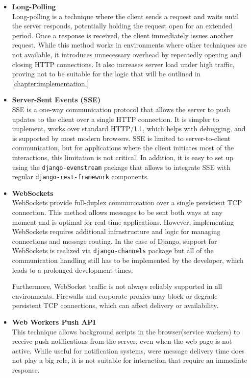 \begin{itemize}
    \item \textbf{Long-Polling} \\
    Long-polling is a technique where the client sends a request and waits until the server responds,
    potentially holding the request open for an extended period.
    Once a response is received, the client immediately issues another request.
    While this method works in environments where other techniques are not available,
    it introduces unnecessary overhead by repeatedly opening and closing HTTP connections.
    It also increases server load under high traffic, proving not to be suitable for the logic that will be outlined
    in \ref{chapter:implementation.}

    \item \textbf{Server-Sent Events (SSE)} \\
    SSE is a one-way communication protocol that allows the server to push updates to the client over a
    single HTTP connection. It is simpler to implement, works over standard HTTP/1.1, which helps with debugging,
    and is supported by most modern browsers.\cite{sse}
    SSE is limited to server-to-client communication, but for applications where the client initiates
    most of the interactions, this limitation is not critical. In addition, it is easy to set up using the
    \texttt{django-evenstream}\cite{django_sse} package that allows to integrate
    SSE with regular \texttt{django-rest-framework} components.

    \item \textbf{WebSockets} \\
    WebSockets provide full-duplex communication over a single persistent TCP connection.
    This method allows messages to be sent both ways at any moment and is optimal for real-time applications\cite{websockets}.
    However, implementing WebSockets requires additional infrastructure and logic for
    managing connections and message routing. In the case of Django, support for WebSockets is realized via
    \texttt{django-channels} package but all of the communication handling still has to be implemented by the developer,
    which leads to a prolonged development times.

    Furthermore, WebSocket traffic is not always reliably supported in all environments.
    Firewalls and corporate proxies may block or degrade persistent TCP connections,
    which can affect delivery or availability.

    \item \textbf{Web Workers Push API} \\
    This technique allows background scripts in the browser(service workers) to receive push notifications from the server,
    even when the web page is not active.\cite{pushapi} While useful for notification systems, were message
    delivery time does not play a big role,
    it is not suitable for interaction that require an immediate response.
\end{itemize}

